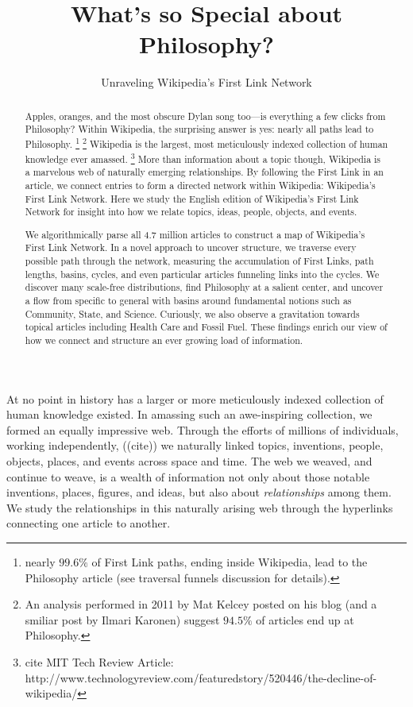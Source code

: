 \documentclass[twoside]{article}
\title{\vspace{-5mm}%
	\fontsize{24pt}{12pt}\selectfont
	\textbf{What's so Special about Philosophy?} 
	}
\author{%
\fontsize{14pt}{14pt}\selectfont
	Unraveling Wikipedia's First Link Network \vspace{-2mm}\\
	}
\date{}
\begin{document}
\maketitle
\thispagestyle{fancy}

\begin{abstract}
\fontsize{12pt}{12pt}
\selectfont

Apples, oranges, and the most obscure Dylan song too---is everything a few clicks from Philosophy? 
Within Wikipedia, the surprising answer is yes: nearly all 
paths lead to Philosophy.
\footnote{
nearly $99.6\%$ of First Link paths, ending inside Wikipedia, lead to the Philosophy article (see traversal funnels discussion for details).}
\footnote{
An analysis performed in 2011 by Mat Kelcey posted on his blog (and a smiliar post by Ilmari Karonen) suggest $94.5\%$ of articles end up at Philosophy.
}
Wikipedia is the largest, most meticulously indexed collection of human knowledge ever amassed. 
\footnote{
cite MIT Tech Review Article: http://www.technologyreview.com/featuredstory/520446/the-decline-of-wikipedia/
}
More than information about a topic though, Wikipedia is a marvelous web of naturally emerging relationships.  
By following the First Link in an article, we connect entries to form a directed network within Wikipedia: Wikipedia's First Link Network. 
Here we study the English edition of Wikipedia's First Link Network for insight into how we relate topics, ideas, people, objects, and events.  


We algorithmically parse all 4.7 million articles to construct a map of Wikipedia's First Link Network. 
In a novel approach to uncover structure, we traverse every possible path through the network, 
measuring the accumulation of First Links, path lengths, basins, cycles, and even particular articles funneling links into the cycles.
We discover many scale-free distributions, find Philosophy at a salient center, and uncover a flow from specific to general with 
basins around fundamental notions such as Community, State, and Science. 
Curiously, we also observe a gravitation towards topical articles including Health Care and Fossil Fuel.
These findings enrich our view of how we connect and structure
an ever growing load of information.

\end{abstract}

\fontsize{11pt}{11pt}
\selectfont

At no point in history has a larger or more meticulously indexed collection of human knowledge existed.
In amassing such an awe-inspiring collection, we formed an equally impressive web. 
Through the efforts of millions of individuals, working independently,
((cite))
we naturally linked topics, inventions, people, objects, places, and events across space and time.
The web we weaved, and continue to weave, is a wealth of information not only about those notable inventions, 
places, figures, and ideas, but also about \textit{relationships} among them.
We study the relationships in this naturally arising web through the hyperlinks connecting one article to another.
\end{document}
